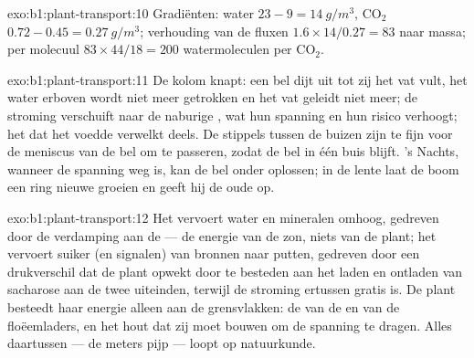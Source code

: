 \begin{solution}{exo:b1:plant-transport:10}
Gradiënten: water $23 - 9 = \qty{14}{g/m^3}$, $\mathrm{CO_2}$ $0.72 -
0.45 = \qty{0.27}{g/m^3}$; verhouding van de fluxen $1.6\times 14/0.27 = 83$
naar massa; per molecuul $83\times 44/18 = 200$ watermoleculen per
$\mathrm{CO_2}$.
\end{solution}

\begin{solution}{exo:b1:plant-transport:11}
De kolom knapt: een bel dijt uit tot zij het vat vult, het water erboven
wordt niet meer getrokken en het vat geleidt niet meer; de stroming
verschuift naar de naburige , wat hun spanning en hun risico verhoogt;
het  dat het voedde verwelkt deels. De stippels tussen de buizen zijn te
fijn voor de meniscus van de bel om te passeren, zodat de bel in één buis
blijft. 's Nachts, wanneer de spanning weg is, kan de bel onder 
oplossen; in de lente laat de boom een ring nieuwe  groeien en geeft
hij de oude op.
\end{solution}

\begin{solution}{exo:b1:plant-transport:12}
Het  vervoert water en mineralen omhoog, gedreven door de verdamping
aan de  --- de energie van de zon, niets van de plant; het 
vervoert suiker (en signalen) van bronnen naar putten, gedreven door een
drukverschil dat de plant opwekt door  te besteden aan het laden en
ontladen van sacharose aan de twee uiteinden, terwijl de stroming ertussen
gratis is. De plant besteedt haar energie alleen aan de grensvlakken: de
 van de  en van de floëemladers, en het hout dat zij
moet bouwen om de spanning te dragen. Alles daartussen --- de meters pijp ---
loopt op natuurkunde.
\end{solution}


